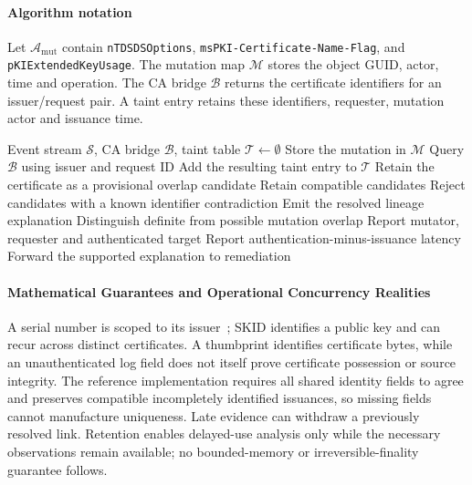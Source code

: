 \paragraph{Algorithm notation}
Let $\mathcal A_{\mathrm{mut}}$ contain \texttt{nTDSDSOptions}, \texttt{msPKI-Certificate-Name-Flag}, and \texttt{pKIExtendedKeyUsage}. The mutation map $\mathcal M$ stores the object GUID, actor, time and operation. The CA bridge $\mathcal B$ returns the certificate identifiers for an issuer/request pair. A taint entry retains these identifiers, requester, mutation actor and issuance time.

\begin{algorithm}[tbp]
\caption{CIPG certificate-lineage update}
\label{alg:invariant5}
\footnotesize
\begin{algorithmic}[1]
\Require Event stream $\mathcal S$, CA bridge $\mathcal B$, taint table $\mathcal T\gets\emptyset$
  \State Store the mutation in $\mathcal M$
  \State Query $\mathcal B$ using issuer and request ID
  \State Add the resulting taint entry to $\mathcal T$
  \State Retain the certificate as a provisional overlap candidate
  \State Retain compatible candidates
  \State Reject candidates with a known identifier contradiction
   \State Emit the resolved lineage explanation
   \State Distinguish definite from possible mutation overlap
   \State Report mutator, requester and authenticated target
   \State Report authentication-minus-issuance latency
   \State Forward the supported explanation to remediation
  \EndIf
 \EndIf
\EndFor
\end{algorithmic}
\end{algorithm}


\paragraph{Mathematical Guarantees and Operational Concurrency Realities}
A serial number is scoped to its issuer~\cite{rfc5280}; SKID identifies a public key and can recur across distinct certificates. A thumbprint identifies certificate bytes, while an unauthenticated log field does not itself prove certificate possession or source integrity. The reference implementation requires all shared identity fields to agree and preserves compatible incompletely identified issuances, so missing fields cannot manufacture uniqueness. Late evidence can withdraw a previously resolved link. Retention enables delayed-use analysis only while the necessary observations remain available; no bounded-memory or irreversible-finality guarantee follows.

